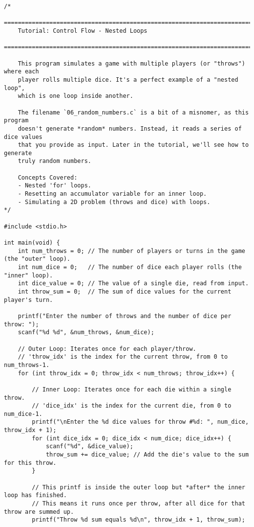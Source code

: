 \documentclass[11pt]{book}
\begin{document}
\begin{verbatim}
/*
    ================================================================================
    Tutorial: Control Flow - Nested Loops
    ================================================================================

    This program simulates a game with multiple players (or "throws") where each
    player rolls multiple dice. It's a perfect example of a "nested loop",
    which is one loop inside another.

    The filename `06_random_numbers.c` is a bit of a misnomer, as this program
    doesn't generate *random* numbers. Instead, it reads a series of dice values
    that you provide as input. Later in the tutorial, we'll see how to generate
    truly random numbers.

    Concepts Covered:
    - Nested 'for' loops.
    - Resetting an accumulator variable for an inner loop.
    - Simulating a 2D problem (throws and dice) with loops.
*/

#include <stdio.h>

int main(void) {
    int num_throws = 0; // The number of players or turns in the game (the "outer" loop).
    int num_dice = 0;   // The number of dice each player rolls (the "inner" loop).
    int dice_value = 0; // The value of a single die, read from input.
    int throw_sum = 0;  // The sum of dice values for the current player's turn.

    printf("Enter the number of throws and the number of dice per throw: ");
    scanf("%d %d", &num_throws, &num_dice);

    // Outer Loop: Iterates once for each player/throw.
    // 'throw_idx' is the index for the current throw, from 0 to num_throws-1.
    for (int throw_idx = 0; throw_idx < num_throws; throw_idx++) {

        // Inner Loop: Iterates once for each die within a single throw.
        // 'dice_idx' is the index for the current die, from 0 to num_dice-1.
        printf("\nEnter the %d dice values for throw #%d: ", num_dice, throw_idx + 1);
        for (int dice_idx = 0; dice_idx < num_dice; dice_idx++) {
            scanf("%d", &dice_value);
            throw_sum += dice_value; // Add the die's value to the sum for this throw.
        }

        // This printf is inside the outer loop but *after* the inner loop has finished.
        // This means it runs once per throw, after all dice for that throw are summed up.
        printf("Throw %d sum equals %d\n", throw_idx + 1, throw_sum);


\end{verbatim}
\end{document}
